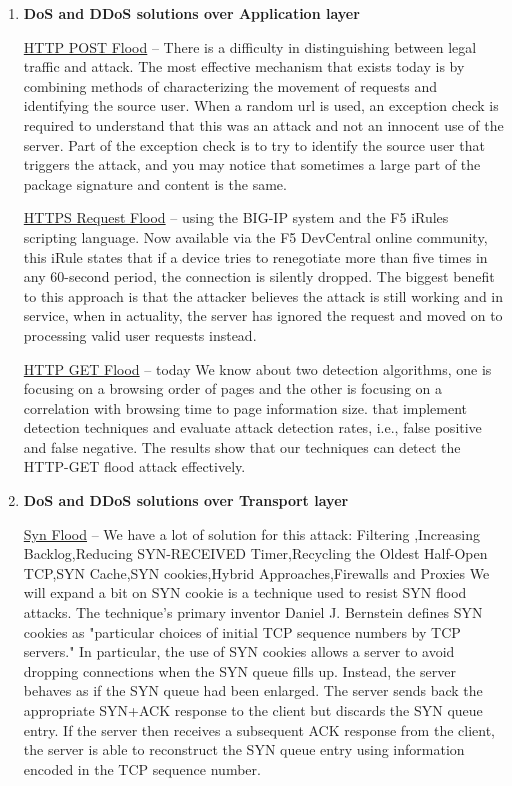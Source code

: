 \documentclass{article}
\begin{document}
\begin{enumerate}

\item \textbf{ DoS and DDoS solutions over Application layer}
 

 \hfill \break \underline{HTTP POST Flood} – There is a difficulty in distinguishing between legal traffic and attack.
The most effective mechanism that exists today is by combining methods of characterizing the movement of requests and identifying the source user.
When a random url is used, an exception check is required to understand that this was an attack and not an innocent use of the server. Part of the exception check is to try to identify the source user that triggers the attack, and you may notice that sometimes a large part of the package signature and content is the same.

 \hfill \break\underline{HTTPS Request Flood} – using the BIG-IP system and the F5 iRules scripting language.
Now available via the F5 DevCentral online community, this iRule states that if a device tries to renegotiate more than five times in any 60-second period, the connection is silently dropped.
The biggest benefit to this approach is that the attacker believes the attack is still working and in service, when in actuality, the server has ignored the request and moved on to processing valid user requests instead.


 \hfill \break\underline{HTTP GET Flood} – today We know about two detection algorithms, one is focusing on a browsing order of pages and the other is focusing on a correlation with browsing time to page information size. that implement detection techniques and evaluate attack detection rates, i.e., false positive and false negative. The results show that our techniques can detect the HTTP-GET flood attack effectively.


\item \textbf{DoS and DDoS solutions over Transport layer} 

 \hfill \break \underline{Syn Flood} – We have a lot of solution for this attack:
Filtering ,Increasing Backlog,Reducing SYN-RECEIVED Timer,Recycling the Oldest Half-Open TCP,SYN Cache,SYN cookies,Hybrid Approaches,Firewalls and Proxies
We will expand a bit on SYN cookie is a technique used to resist SYN flood attacks. The technique's primary inventor Daniel J. Bernstein defines SYN cookies as "particular choices of initial TCP sequence numbers by TCP servers." In particular, the use of SYN cookies allows a server to avoid dropping connections when the SYN queue fills up. Instead, the server behaves as if the SYN queue had been enlarged. The server sends back the appropriate SYN+ACK response to the client but discards the SYN queue entry. If the server then receives a subsequent ACK response from the client, the server is able to reconstruct the SYN queue entry using information encoded in the TCP sequence number.


\end{enumerate}
\end{document}
